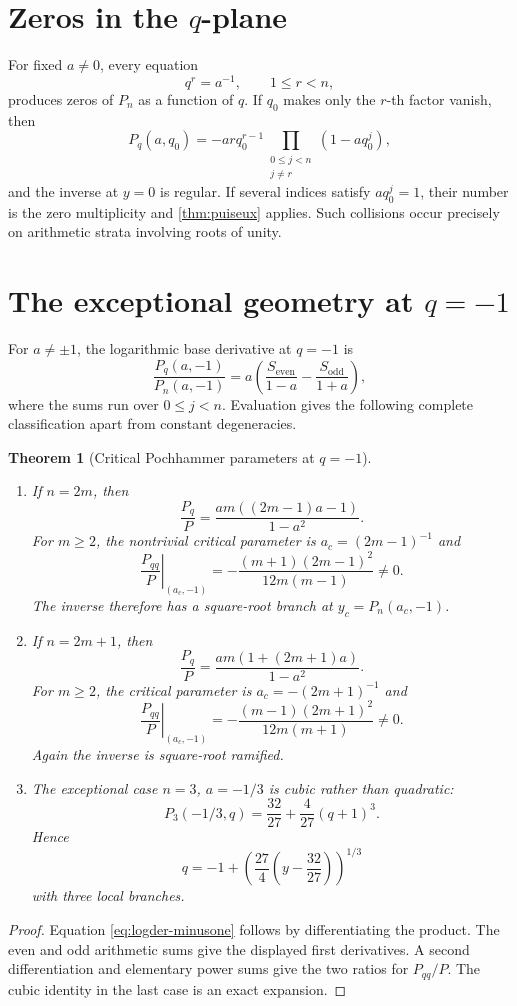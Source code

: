 \documentclass[11pt,oneside]{book}
\newtheorem{theorem}{Theorem}[chapter]
\theoremstyle{definition}
\theoremstyle{remark}
\begin{document}
\section{Zeros in the $q$-plane}
For fixed $a\ne0$, every equation
\[
 q^r=a^{-1},\qquad 1\le r<n,
\]
produces zeros of $P_n$ as a function of $q$.  If $q_0$ makes only the
$r$-th factor vanish, then
\begin{equation}\label{eq:qzero-derivative-general}
 P_q(a,q_0)=-arq_0^{r-1}
 \prod_{\substack{0\le j<n\\j\ne r}}(1-aq_0^j),
\end{equation}
and the inverse at $y=0$ is regular.  If several indices satisfy
$aq_0^j=1$, their number is the zero multiplicity and
\cref{thm:puiseux} applies.  Such collisions occur precisely on arithmetic
strata involving roots of unity.

\section{The exceptional geometry at $q=-1$}
For $a\ne\pm1$, the logarithmic base derivative at $q=-1$ is
\begin{equation}\label{eq:logder-minusone}
 \frac{P_q(a,-1)}{P_n(a,-1)}
 =a\left(\frac{S_{\mathrm{even}}}{1-a}
          -\frac{S_{\mathrm{odd}}}{1+a}\right),
\end{equation}
where the sums run over $0\le j<n$.  Evaluation gives the following complete
classification apart from constant degeneracies.

\begin{theorem}[Critical Pochhammer parameters at $q=-1$]\label{thm:critical-minus-one}
\begin{enumerate}
\item If $n=2m$, then
\[
 \frac{P_q}{P}=\frac{am((2m-1)a-1)}{1-a^2}.
\]
For $m\ge2$, the nontrivial critical parameter is
$a_c=(2m-1)^{-1}$ and
\[
 \left.\frac{P_{qq}}P\right|_{(a_c,-1)}
 =-\frac{(m+1)(2m-1)^2}{12m(m-1)}\ne0.
\]
The inverse therefore has a square-root branch at
$y_c=P_n(a_c,-1)$.
\item If $n=2m+1$, then
\[
 \frac{P_q}{P}=\frac{am(1+(2m+1)a)}{1-a^2}.
\]
For $m\ge2$, the critical parameter is $a_c=-(2m+1)^{-1}$ and
\[
 \left.\frac{P_{qq}}P\right|_{(a_c,-1)}
 =-\frac{(m-1)(2m+1)^2}{12m(m+1)}\ne0.
\]
Again the inverse is square-root ramified.
\item The exceptional case $n=3$, $a=-1/3$ is cubic rather than quadratic:
\[
 P_3(-1/3,q)=\frac{32}{27}+\frac4{27}(q+1)^3.
\]
Hence
\[
 q=-1+\left(\frac{27}{4}\left(y-\frac{32}{27}\right)\right)^{1/3}
\]
with three local branches.
\end{enumerate}
\end{theorem}
\begin{proof}
Equation \eqref{eq:logder-minusone} follows by differentiating the product.
The even and odd arithmetic sums give the displayed first derivatives.
A second differentiation and elementary power sums give the two ratios for
$P_{qq}/P$.  The cubic identity in the last case is an exact expansion.
\end{proof}
\end{document}
